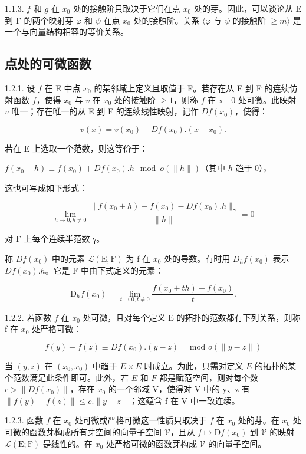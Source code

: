 1.1.3. \(f\) 和 \(g\) 在 \(x_{0}\) 处的接触阶只取决于它们在点 \(x_{0}\) 处的芽。因此，可以谈论从 E 到 F 的两个映射芽 \(\varphi\) 和 \(\psi\) 在点 \(x_{0}\) 处的接触阶。关系 \(\langle\varphi\) 与 \(\psi\) 的接触阶 \(\geqslant m\rangle\) 是一个与向量结构相容的等价关系。

\subsection{点处的可微函数}

1.2.1. 设 \(f\) 在 E 中点 \(x_{0}\) 的某邻域上定义且取值于 F。若存在从 E 到 F 的连续仿射函数 \(f\)，使得 \(x_{0}\) 与 \(v\) 在 \(x_{0}\) 处的接触阶 \(\geqslant 1\)，则称 \(f\) 在 x＿0 处可微。此映射 \(v\) 唯一；存在唯一的从 E 到 F 的连续线性映射，记作 \(Df(x_{0})\)，使得：

\[
v (x) = v \left(x _ {0}\right) + D f \left(x _ {0}\right). \left(x - x _ {0}\right).
\]

若在 E 上选取一个范数，则这等价于：

\(f(x_0 + h) \equiv f(x_0) + Df(x_0).h \mod o(\|h\|)\)（其中 \(h\) 趋于 0），

这也可写成如下形式：

\[
\lim _ {h \rightarrow 0, h \neq 0} \frac {\| f (x _ {0} + h) - f (x _ {0}) - D f (x _ {0}) . h \| _ {\gamma}}{\| h \|} = 0
\]

对 F 上每个连续半范数 γ。

称 \(Df(x_{0})\) 中的元素 \(\mathcal{L}(\mathrm{E},\mathrm{F})\) 为 f 在 \(x_{0}\) 处的导数。有时用 \(D_{h}f(x_{0})\) 表示 \(Df(x_{0}).h\)。它是 F 中由下式定义的元素：

\[
\mathrm{D} _ {h} f (x _ {0}) = \lim _ {t \rightarrow 0, t \neq 0} \frac {f (x _ {0} + t h) - f (x _ {0})}{t}.
\]

1.2.2. 若函数 \(f\) 在 \(x_{0}\) 处可微，且对每个定义 E 的拓扑的范数都有下列关系，则称 f 在 \(x_{0}\) 处严格可微：

\[
f (y) - f (z) \equiv D f (x _ {0}). (y - z) \quad \text {   mod   } o (\| y - z \|)
\]

当 \((y, z)\) 在 \((x_0, x_0)\) 中趋于 \(E \times E\) 时成立。为此，只需对定义 \(E\) 的拓扑的某个范数满足此条件即可。此外，若 \(E\) 和 \(F\) 都是赋范空间，则对每个数 \(c > \|Df(x_0)\|\)，存在 \(x_{0}\) 的一个邻域 V，使得对 V 中的 y、z 有 \(\|f(y)-f(z)\|\leqslant c.\|y-z\|\)；这蕴含 f 在 V 中一致连续。

1.2.3. 函数 \(f\) 在 \(x_{0}\) 处可微或严格可微这一性质只取决于 \(f\) 在 \(x_{0}\) 处的芽。在 \(x_{0}\) 处可微的函数芽构成所有芽空间的向量子空间 \(\mathcal{V}\)，且从 \(f\mapsto\mathrm{D}f(x_{0})\) 到 \(\mathcal{V}\) 的映射 \(\mathcal{L}(\mathrm{E};\mathrm{F})\) 是线性的。在 \(x_{0}\) 处严格可微的函数芽构成 \(\mathcal{V}\) 的向量子空间。

